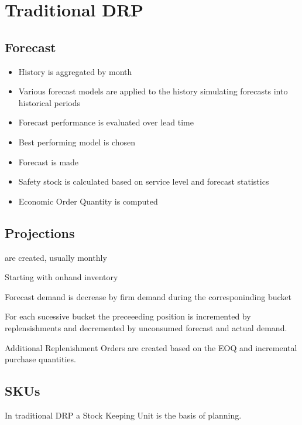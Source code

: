\documentclass[letterpaper,10pt,english]{sphinxmanual}
\begin{document}
\chapter{Traditional DRP}
\label{\detokenize{BusinessProcessReengineering:traditional-drp}}

\section{Forecast}
\label{\detokenize{BusinessProcessReengineering:forecast}}\begin{itemize}
\item {} 
History is aggregated by month

\item {} 
Various forecast models are applied to the history simulating
forecasts into historical periods

\item {} 
Forecast performance is evaluated over lead time

\item {} 
Best performing model is chosen

\item {} 
Forecast is made

\item {} 
Safety stock is calculated based on service level and forecast
statistics

\item {} 
Economic Order Quantity is computed

\end{itemize}


\section{Projections}
\label{\detokenize{BusinessProcessReengineering:projections}}
 are created, usually monthly

Starting with onhand inventory

Forecast demand is decrease by firm demand during the corresponinding
bucket

For each sucessive bucket the preceeeding position is incremented by
replensishments and decremented by unconsumed forecast and actual
demand.

Additional Replenishment Orders are created based on the EOQ and
incremental purchase quantities.


\section{SKUs}
\label{\detokenize{BusinessProcessReengineering:skus}}
In traditional DRP a Stock Keeping Unit is the basis of planning.
\end{document}
